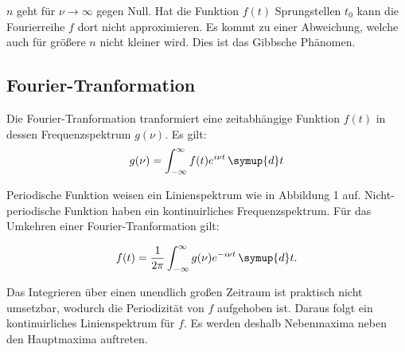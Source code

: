 $n$ geht für $\nu \to \infty$ gegen Null.
Hat die Funktion $f(t)$ Sprungstellen $t_0$ kann die Fourierreihe $f$ dort nicht approximieren. Es kommt zu einer
Abweichung, welche auch für größere $n$ nicht kleiner wird. Dies ist das Gibbsche Phänomen.

\subsection{Fourier-Tranformation}
Die Fourier-Tranformation tranformiert eine zeitabhängige Funktion $f(t)$ in dessen Frequenzspektrum $g(\nu)$. Es gilt:
\begin{equation}
  g(\nu) = \int_{-\infty}^{\infty} f(t) e^{i\nu t} \, \symup{d}t
\end{equation}

Periodische Funktion weisen ein Linienspektrum wie in Abbildung 1 auf. Nicht-periodische Funktion haben ein
kontinuirliches Frequenzspektrum. Für das Umkehren einer Fourier-Tranformation gilt:

\begin{equation}
  f(t) = \frac{1}{2\pi} \int_{-\infty}^{\infty} g(\nu) e^{-i\nu t} \, \symup{d}t .
\end{equation}

Das Integrieren über einen unendlich großen Zeitraum ist praktisch nicht umsetzbar, wodurch die
Periodizität von $f$ aufgehoben ist. Daraus folgt ein kontinuirliches Linienspektrum für $f$.
Es werden deshalb Nebenmaxima neben den Hauptmaxima auftreten.
